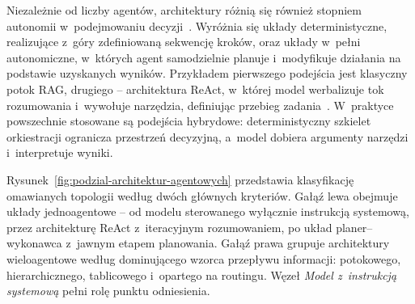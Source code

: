 Niezależnie od liczby agentów, architektury różnią się również stopniem
autonomii w~podejmowaniu decyzji~\cite{weng2023agentm wang2024survey, xi2025rise}. Wyróżnia
się układy deterministyczne, realizujące z~góry zdefiniowaną sekwencję kroków,
oraz układy w~pełni autonomiczne, w~których agent samodzielnie planuje
i~modyfikuje działania na podstawie uzyskanych wyników. Przykładem pierwszego
podejścia jest klasyczny potok RAG, drugiego -- architektura ReAct, w~której
model werbalizuje tok rozumowania i~wywołuje narzędzia, definiując przebieg
zadania~\cite{yao2022react}. W~praktyce powszechnie stosowane są podejścia
hybrydowe: deterministyczny szkielet orkiestracji ogranicza przestrzeń
decyzyjną, a~model dobiera argumenty narzędzi i~interpretuje wyniki.

Rysunek~\ref{fig:podzial-architektur-agentowych} przedstawia klasyfikację
omawianych topologii według dwóch głównych kryteriów. Gałąź lewa obejmuje
układy jednoagentowe -- od modelu sterowanego wyłącznie instrukcją systemową,
przez architekturę ReAct z~iteracyjnym rozumowaniem, po układ planer--wykonawca
z~jawnym etapem planowania. Gałąź prawa grupuje architektury wieloagentowe
według dominującego wzorca przepływu informacji: potokowego, hierarchicznego,
tablicowego i~opartego na routingu. Węzeł \textit{Model z~instrukcją systemową}
pełni rolę punktu odniesienia.

